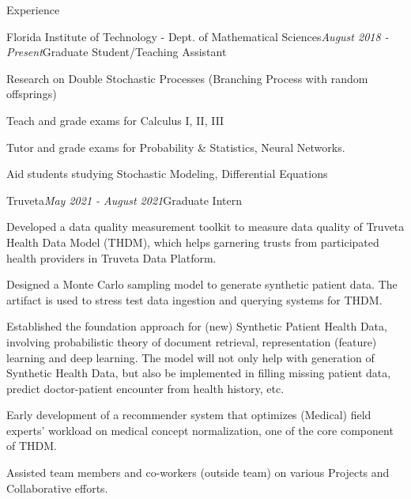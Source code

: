 \documentclass{resume} %
\begin{document}

\begin{rSection}{Experience}

    \begin{rSubsection}{Florida Institute of Technology - Dept. of Mathematical Sciences}{\em August 2018 - Present}{Graduate Student/Teaching Assistant}{}
        \item Research on Double Stochastic Processes (Branching Process with random offsprings)
        \item Teach and grade exams for Calculus I, II, III
        \item Tutor and grade exams for Probability \& Statistics, Neural Networks.
        \item Aid students studying Stochastic Modeling, Differential Equations
    \end{rSubsection}

    \begin{rSubsection}{Truveta}{\em May 2021 - August 2021}{Graduate Intern}{}
            \item Developed a data quality measurement toolkit to measure data quality of Truveta Health Data Model (THDM), which helps garnering trusts from participated health providers in Truveta Data Platform.
            \item Designed a Monte Carlo sampling model to generate synthetic patient data. The artifact is used to stress test data ingestion and querying systems for THDM.
            \item Established the foundation approach for (new) Synthetic Patient Health Data, involving probabilistic theory of document retrieval, representation (feature) learning and deep learning. The model will not only help with generation of Synthetic Health Data, but also be implemented in filling missing patient data, predict doctor-patient encounter from health history, etc.
            \item Early development of a recommender system that optimizes (Medical) field experts' workload on medical concept normalization, one of the core component of THDM.
            \item Assisted team members and co-workers (outside team) on various Projects and Collaborative efforts.
    \end{rSubsection}


\end{rSection}
\end{document}

